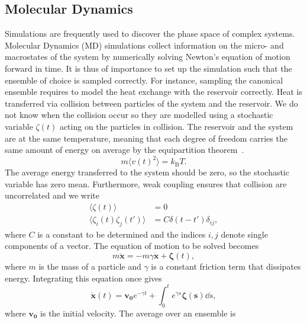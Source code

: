 \subsection{Molecular Dynamics}
Simulations are frequently used to discover the phase space of complex systems. Molecular Dynamics (MD) simulations collect information on the micro- and macrostates of the system by numerically solving Newton's equation of motion forward in time.  It is thus of importance to set up the simulation such that the ensemble of choice is sampled correctly. For instance, sampling the canonical ensemble requires to model the heat exchange with the reservoir correctly. Heat is transferred via collision between particles of the system and the reservoir. We do not know when the collision occur so they are modelled using a stochastic variable $\zeta(t)$ acting on the particles in collision. The reservoir and the system are at the same temperature, meaning that each degree of freedom carries  the same amount of energy on average by the equipartition theorem~\cite{schwabl2006statistische}.
\begin{equation}
 m \langle v(t)^2 \rangle = k_{\mathrm{B}} T.
 \label{eq:EquipartitionTh}
\end{equation}
The average energy transferred to the system should be zero, so the stochastic variable has zero mean. Furthermore, weak coupling ensures that collision are uncorrelated and
we write
\begin{equation}
 \begin{aligned}
  \langle \zeta (t) \rangle &= 0 \\
  \langle \zeta_i (t) \zeta_j(t') \rangle &= C \delta (t- t') \delta_{ij} ,
 \end{aligned}
\end{equation}
where $C$ is a constant to be determined and the indices $i,j$ denote single components of a vector. The equation of motion to be solved becomes
\begin{equation}
 m \mathbf{ \ddot x} = -m\gamma \mathbf{ \dot x }+ \boldsymbol{\zeta}(t), 
 \label{eq:Langevin}
\end{equation}
where $m$ is the mass of a particle and $\gamma$ is a constant friction term that dissipates energy. Integrating this equation once gives
\begin{equation}
 \mathbf{\dot x} (t) = \mathbf{v_0} e^{-\gamma t} + \int_0^t e^{\gamma s} \boldsymbol{\zeta(s)} \dd{s},
\end{equation}
where $\mathbf{v_0}$ is the initial velocity. The average over an ensemble is
